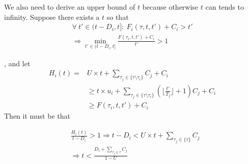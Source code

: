  

We also need to derive an upper bound of $t$ because otherwise $t$ can tends to infinity. Suppose there exists a $t$ so that
\begin{align*}
\forall~t'\in(t-D_i,t]:~F_i(\tau,t,t')+C_i>t'\\
\Rightarrow\min_{t'\in(t-D_i,t]}\frac{F(\tau_i,t,t')+C_i}{t'}>1	
\end{align*}

, and let
\begin{align*}
H_i(t)= & U\times t+\sum_{\tau_j\in\{\tau\setminus\tau_i\}}C_j+C_i\\&\geq t\times u_i+\sum_{\tau_j\in\{\tau\setminus\tau_i\}}(\lfloor \frac{t'}{T_j} \rfloor+1)C_j+C_i\\
&\geq F(\tau_i,t,t')+C_i
\end{align*}
Then it must be that

\begin{align*}
&\frac{H_i(t)}{t-D_i}>1\Rightarrow t-D_i< U\times t+\sum_{\tau_j\in\{\tau\}}C_j\\
&\Rightarrow t<\frac{D_i+\sum_{\tau_j\in\tau}C_j}{1-U}
\end{align*}


